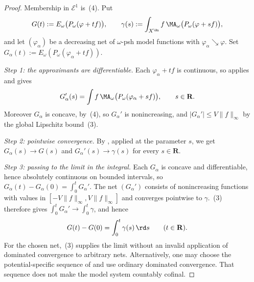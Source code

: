 \begin{proof}
Membership in $\mathcal E^1$ is
\,(4).  Put
\[
 G(t):=E_\omega\bigl(P_\omega(\varphi+tf)\bigr),
 \qquad
 \gamma(s):=\int_{X^{\An}}f\,
     \MA_\omega\bigl(P_\omega(\varphi+sf)\bigr),
\]
and let $(\varphi_\alpha)$ be a decreasing net of $\omega$-psh model
functions with $\varphi_\alpha\searrow\varphi$.  Set
$G_\alpha(t):=E_\omega(P_\omega(\varphi_\alpha+tf))$.

\emph{Step 1: the approximants are differentiable.}
Each $\varphi_\alpha+tf$ is continuous, so
 applies and gives
\[
 G_\alpha'(s)=\int f\,
   \MA_\omega\bigl(P_\omega(\varphi_\alpha+sf)\bigr),
 \qquad s\in\mathbf R .
\]
Moreover $G_\alpha$ is concave, by
\,(4), so $G_\alpha'$ is nonincreasing, and
$|G_\alpha'|\leq V\lVert f\rVert_\infty$ by the global Lipschitz bound
\,(3).

\emph{Step 2: pointwise convergence.}
By , applied at the parameter
$s$, we get $G_\alpha(s)\to G(s)$ and $G_\alpha'(s)\to\gamma(s)$ for
every $s\in\mathbf R$.

\emph{Step 3: passing to the limit in the integral.}
Each $G_\alpha$ is concave and differentiable, hence absolutely continuous
on bounded intervals, so $G_\alpha(t)-G_\alpha(0)=\int_0^tG_\alpha'$.  The
net $(G_\alpha')$ consists of nonincreasing functions with values in
$[-V\lVert f\rVert_\infty,V\lVert f\rVert_\infty]$ and converges
pointwise to $\gamma$.  \,(3) therefore gives
$\int_0^tG_\alpha'\to\int_0^t\gamma$, and hence
\begin{equation}\label{eq:ch27-e1-integrated}
 G(t)-G(0)=\int_0^t\gamma(s)\,\rd s
 \qquad(t\in\mathbf R).
\end{equation}
For the chosen net, \,(3) supplies the
limit without an invalid application of dominated convergence to arbitrary
nets.  Alternatively, one may choose the potential-specific sequence of
 and use ordinary dominated
convergence.  That sequence does not make the model system countably cofinal.


\end{proof}
